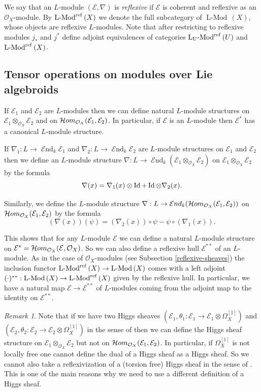\documentclass[12pt]{article}
\theoremstyle{plain}
\theoremstyle{definition}
\theoremstyle{remark}
\newtheorem{Remark}[Thm]{Remark}
\newcommand{\cE}{{\mathcal E}}
\newcommand{\cO}{{\mathcal O}}
\newcommand{\Mod}[1]{\mathop{\operatorname{{#1}-Mod}\, }}
\newcommand{\refMod}[1]{\mathop{\operatorname{{#1}-Mod}^{\mathop{\rm ref}}\, }}
\newcommand{\cHom}{{\mathop{{\cal H}om}}}
\newcommand{\id}{\mathop{\rm Id}}
\newcommand{\End}{{\mathop{{\mathcal E}nd}}}
\begin{document}
We say that an $L$-module  $(\cE , \nabla)$ is \emph{reflexive} if $\cE$ is coherent and reflexive
as an $\cO_X$-module. By 
$\refMod{L} (X)$ we denote the full subcategory of $ \Mod{L} (X)$, whose objects are 
reflexive $L$-modules. Note that after restricting to reflexive modules  
$j_*$ and $j^*$ define adjoint equivalences of categories $\refMod{L _U} (U)$ and $\refMod{L} (X)$.




\subsection{Tensor operations on modules over Lie algebroids}\label{tensors}

If $\cE_1$ and $\cE_2$ are $L$-modules then we can define natural $L$-module structures on $\cE_1\otimes _{\cO_X} \cE_2$ and on $\cHom_{\cO_X} (\cE_1, \cE_2)$. In particular, if $\cE$ is an $L$-module then
$\cE^{*}$ has a canonical $L$-module structure.

If
$\nabla _1: L\to \End _{k} \cE _1$ and $\nabla _2: L\to \End _{k} \cE _2$ 
are $L$-module structures on $\cE_1$ and $\cE_2$ then we define an $L$-module structure 
$\nabla: L\to \End _{k} (\cE_1\otimes _{\cO_X} \cE_2)$ on $ \cE_1\otimes _{\cO_X} \cE_2$ by the formula
$$\nabla (x)=\nabla_1 (x) \otimes \id + \id \otimes \nabla _2(x).$$

Similarly, we define  the $L$-module structure $\nabla: L\to \End _{k} (\cHom_{\cO_X} (\cE _1, \cE_2))$ on $\cHom_{\cO_X} (\cE _1, \cE_2)$
by the formula $$(\nabla (x)) (\psi)=(\nabla_2 (x))\circ \psi -\psi \circ  (\nabla_1(x)).$$


This shows that for any $L$-module $\cE$ we can define a natural $L$-module structure on $\cE ^*=\cHom_{\cO_X} (\cE , \cO_X)$. So we can also define a reflexive hull $\cE ^{**}$ of an $L$-module.
As in the case of $\cO_X$-modules (see Subsection \ref{reflexive-sheaves})
the inclusion functor $\refMod{L} (X)\to \Mod{L} (X) $ comes with a left adjoint $(\cdot )^{**}:  \Mod{L} (X) \to \refMod{L} (X)$ given by the reflexive hull. 
In particular, we have a natural map $\cE\to \cE ^{**}$ of $L$-modules coming from the adjoint map to the identity on 
$ \cE ^{**}$.

\medskip


\begin{Remark}
	Note that if we have two Higgs sheaves
	$(\cE_1, \theta _1: \cE _1\to \cE _1{\otimes} \Omega_X^{[1]})$ and $(\cE_2, \theta _2: \cE _2\to \cE _2{\otimes} \Omega_X^{[1]})$
	in the sense of \cite{GKPT2} then we can define the Higgs sheaf structure on 
	$\cE_1\otimes _{\cO_X} \cE_2$ but not on $\cHom_{\cO_X} (\cE_1, \cE_2)$. In particular, if $\Omega_X^{[1]}$ is not locally free one cannot 
	define the dual of a  Higgs sheaf as a Higgs sheaf. So we cannot also take a reflexivization of a (torsion free) Higgs sheaf in the sense of \cite{GKPT2}. This is one of the main reasons why we need to use a different definition of a Higgs sheaf.
\end{Remark}
\end{document}
